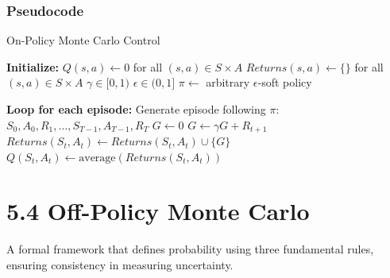 \documentclass[
  letterpaper,
  DIV=11,
  numbers=noendperiod]{scrreprt}
\begin{document}
\subsection{Pseudocode}\label{pseudocode-7}

\begin{algorithm}[htb!]
\caption{On-Policy Monte Carlo Control}
\begin{algorithmic}[1]
\State \textbf{Initialize:} 
\State $Q(s, a) \gets 0$ for all $(s, a) \in S \times A$
\State $Returns(s, a) \gets \{\}$ for all $(s, a) \in S \times A$
\State $\gamma \in [0, 1)$
\State $\epsilon \in (0, 1]$
\State $\pi \gets$ arbitrary $\epsilon$-soft policy

\State \textbf{Loop for each episode:}
\State Generate episode following $\pi$: $S_{0}, A_{0}, R_{1}, \dots, S_{T-1}, A_{T-1}, R_{T}$
\State $G \gets 0$
    \State $G \gets \gamma G + R_{t+1}$
      
        \State $Returns(S_{t}, A_{t}) \gets Returns(S_{t}, A_{t}) \cup \{G\}$
        \State $Q(S_{t}, A_{t}) \gets \text{average}(Returns(S_{t}, A_{t}))$
    \Endif
\Endfor

\end{algorithmic}
\end{algorithm}

\chapter{5.4 Off-Policy Monte Carlo}\label{off-policy-monte-carlo}

\begin{tcolorbox}[enhanced jigsaw, arc=.35mm, toprule=.15mm, leftrule=.75mm, colback=white, left=2mm, colframe=quarto-callout-note-color-frame, rightrule=.15mm, opacityback=0, breakable, bottomrule=.15mm]

A formal framework that defines probability using three fundamental
rules, ensuring consistency in measuring uncertainty. 🎲

\end{tcolorbox}
\end{document}
